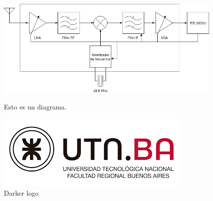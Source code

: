 \begin{figure}[ht]
	\centering
	\begin{minipage}[c]{0.4\linewidth}
		\includegraphics[width=0.9\linewidth]{fig/frontend.png}
		\caption{Esto es un diagrama.}
		\label{fig:logo1}
	\end{minipage}
	\hspace{0.4cm}
	\begin{minipage}[c]{0.4\linewidth}
		\includegraphics[width=0.9\linewidth]{fig/UTNFRBA.png}
		\caption{Darker logo}
		\label{fig:logo2}
	\end{minipage}%
\end{figure}



